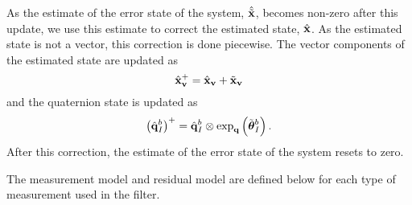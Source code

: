 As the estimate of the error state of the system, $\hat{\tilde{\boldsymbol{\mathrm{x}}}}$, becomes
non-zero after this update, we use this estimate to correct the estimated state,
$\hat{\boldsymbol{\mathrm{x}}}$. As the estimated state is not a vector, this correction is done
piecewise. The vector components of the estimated state are
updated as
\begin{equation}
  \hat{\boldsymbol{\mathrm{\boldsymbol{\mathrm{x}}}}}_{\boldsymbol{\mathrm{v}}}^{+} = \hat{\boldsymbol{\mathrm{\boldsymbol{\mathrm{x}}}}}_{\boldsymbol{\mathrm{v}}} + \tilde{\boldsymbol{\mathrm{\boldsymbol{\mathrm{x}}}}}_{\boldsymbol{\mathrm{v}}}
\end{equation}
and the quaternion state is updated as
\begin{equation}
  \left( \hat{\boldsymbol{\mathrm{q}}}_I^b \right)^{+}  = \hat{\boldsymbol{\mathrm{q}}}_I^b \otimes \exp_{\boldsymbol{\mathrm{q}}} \left(
  \tilde{\boldsymbol{\mathrm{\theta}}}_I^b \right).
\end{equation}
After this correction, the estimate of the error state of the system resets to
zero.

The measurement model and residual model
are defined below for each type of measurement used in the filter.

